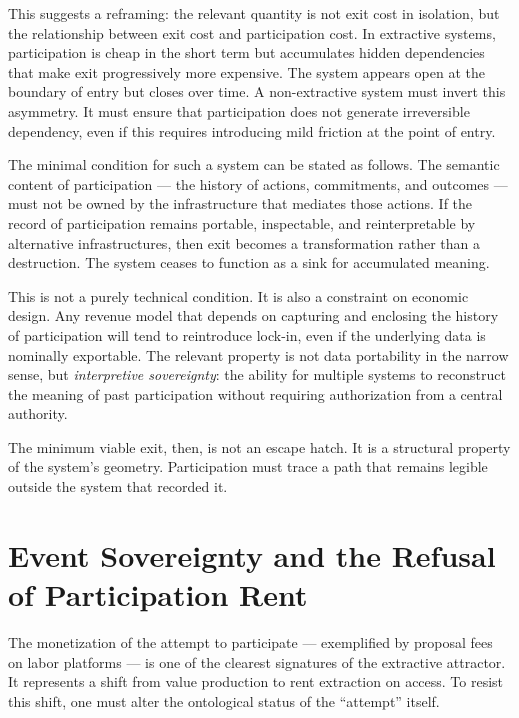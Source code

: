 \documentclass[12pt, a4paper]{article}
\begin{document}
This suggests a reframing: the relevant quantity is not exit cost in isolation,
but the relationship between exit cost and participation cost. In extractive
systems, participation is cheap in the short term but accumulates hidden
dependencies that make exit progressively more expensive. The system appears
open at the boundary of entry but closes over time. A non-extractive system must
invert this asymmetry. It must ensure that participation does not generate
irreversible dependency, even if this requires introducing mild friction at the
point of entry.

The minimal condition for such a system can be stated as follows. The semantic
content of participation --- the history of actions, commitments, and outcomes
--- must not be owned by the infrastructure that mediates those actions. If the
record of participation remains portable, inspectable, and reinterpretable by
alternative infrastructures, then exit becomes a transformation rather than a
destruction. The system ceases to function as a sink for accumulated meaning.

This is not a purely technical condition. It is also a constraint on economic
design. Any revenue model that depends on capturing and enclosing the history of
participation will tend to reintroduce lock-in, even if the underlying data is
nominally exportable. The relevant property is not data portability in the
narrow sense, but \emph{interpretive sovereignty}: the ability for multiple
systems to reconstruct the meaning of past participation without requiring
authorization from a central authority.

The minimum viable exit, then, is not an escape hatch. It is a structural
property of the system's geometry. Participation must trace a path that remains
legible outside the system that recorded it.

\section{Event Sovereignty and the Refusal of Participation Rent}

The monetization of the attempt to participate --- exemplified by proposal fees
on labor platforms --- is one of the clearest signatures of the extractive
attractor. It represents a shift from value production to rent extraction on
access. To resist this shift, one must alter the ontological status of the
``attempt'' itself.
\end{document}
